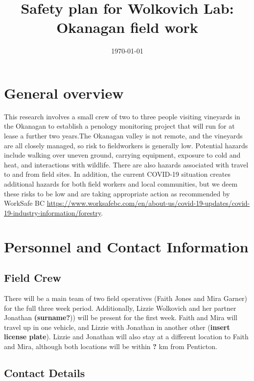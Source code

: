 \documentclass[11pt,letter]{article}
\begin{document}

\renewcommand{\refname}{\CHead{}}

\title{Safety plan for Wolkovich Lab: Okanagan field work}
\date{\today}
\maketitle
\tableofcontents

\section{General overview}
This research involves a small crew of two to three people visiting vineyards in the Okanagan to establish a penology monitoring project that will run for at lease a further two years.The Okanagan valley is not remote, and the vineyards are all closely managed, so risk to fieldworkers is generally low. Potential hazards include walking over uneven ground, carrying equipment, exposure to cold and heat, and interactions with wildlife. There are also hazards associated with travel to and from field sites. In addition, the current COVID-19 situation creates additional hazards for both field workers and local communities, but we deem these risks to be low and are taking appropriate action as recommended by WorkSafe BC \url{https://www.worksafebc.com/en/about-us/covid-19-updates/covid-19-industry-information/forestry}. 

\section{Personnel and Contact Information}

\subsection {Field Crew}

There will be a main team of two field operatives (Faith Jones and Mira Garner) for the full three week period. Additionally, Lizzie Wolkovich and her partner Jonathan \textbf{(surname?})) will be present for the first week. Faith and Mira will travel up in one vehicle, and Lizzie with Jonathan in another other (\textbf{insert license plate}). Lizzie and Jonathan will also stay at a different location to Faith and Mira, although both locations will be within \textbf{?} km from Penticton.   

\subsection {Contact Details}
\end{document}
